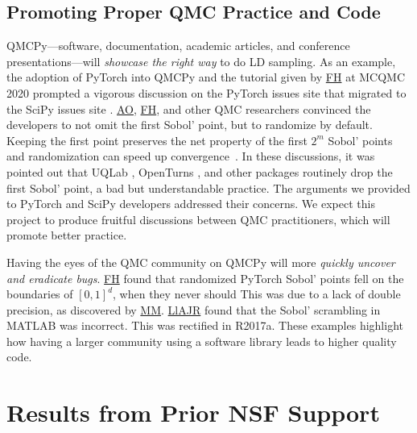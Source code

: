 \documentclass[11pt]{NSFamsart}
\newcommand{\FH}{\hyperlink{FHlink}{FH}\xspace}
\newcommand{\AO}{\hyperlink{AOlink}{AO}\xspace}
\newcommand{\MM}{\hyperlink{MMlink}{MM}\xspace}
\newcommand{\LlAJR}{\hyperlink{LlAJRlink}{LlAJR}\xspace}
\newcommand{\SciPy}{SciPy\xspace}
\newcommand{\PyTorch}{PyTorch\xspace}
\begin{document}
\subsection{Promoting Proper QMC Practice and Code} \label{sec:goodpractice}
QMCPy---software, documentation, academic articles, and conference presentations---will \emph{showcase the right way} to do LD sampling.  As an example, the adoption of \PyTorch into QMCPy and the tutorial given by \FH at MCQMC 2020 \cite{MCQMC2020QMCPyTut, ChoEtal22a} prompted a vigorous discussion on the \PyTorch issues site \cite{PyTorchFirstPt2020a} that migrated to the \SciPy issues site \cite{scipySobol2020a}.  \AO, \FH, and other QMC researchers convinced the developers to not omit the first Sobol' point, but to randomize by default.  Keeping the first point preserves the net property of the first $2^m$ Sobol' points and randomization can speed up convergence~\cite{owen2020dropping}. In these discussions, it was pointed out that UQLab \cite{UQLab2014}, OpenTurns \cite{OpenTURNS}, and other packages routinely drop the first Sobol' point, a bad but understandable practice.  The arguments we provided to \PyTorch and \SciPy developers addressed their concerns.  We expect this project to produce fruitful discussions between QMC practitioners, which will promote better practice.

Having the eyes of the QMC community on QMCPy will more \emph{quickly uncover and eradicate bugs}.  \FH found  that randomized \PyTorch Sobol' points fell on the boundaries of $[0,1]^d$, when they never should \cite{PyTorchFirstPt2020a} This was due to a lack of double precision, as discovered by \MM.  \LlAJR found that the Sobol' scrambling in MATLAB was incorrect.  This was rectified in R2017a.  These examples highlight how having a larger community using a software library leads to higher quality code.


\section{Results from Prior NSF Support} \label{sec:prior_work}
\end{document}
